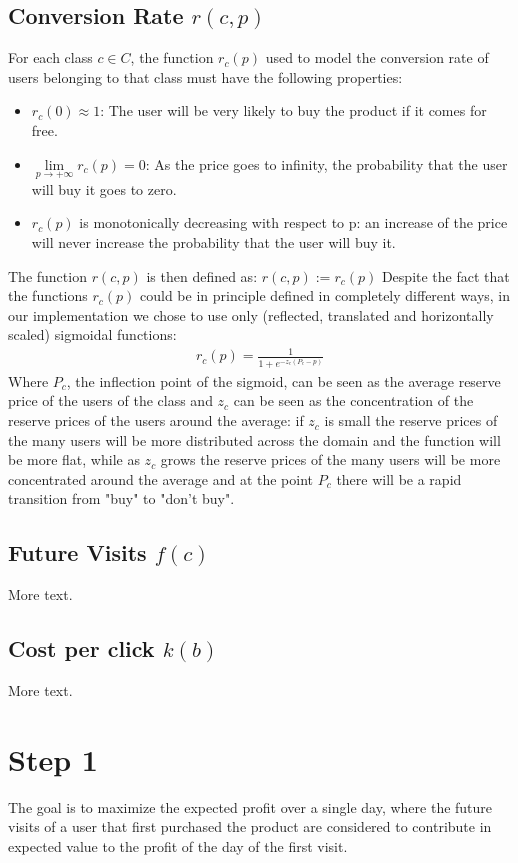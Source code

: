 \documentclass[11pt]{article} %
\begin{document}
\subsection{Conversion Rate $r(c,p)$}
For each class $c \in C$, the function $r_c(p)$ used to model the conversion rate of users belonging to that class must have the following properties:
\begin{itemize}
\item $r_c(0) \approx 1$: The user will be very likely to buy the product if it comes for free.
\item $\lim\limits_{p \to +\infty} r_c(p) = 0$: As the price goes to infinity, the probability that the user will buy it goes to zero.
\item $r_c(p)$ is monotonically decreasing with respect to p: an increase of the price will never increase the probability that the user will buy it.
\end{itemize}
The function $r(c,p)$ is then defined as: $r(c,p) := r_c(p)$
Despite the fact that the functions $r_c(p)$ could be in principle defined in completely different ways, in our implementation we chose to use only (reflected, translated and horizontally scaled) sigmoidal functions:
\begin{align*}
r_c(p) = \frac{1}{1+e^{-z_c(P_c-p)}}
\end{align*}
Where $P_c$, the inflection point of the sigmoid, can be seen as the average reserve price of the users of the class and $z_c$ can be seen as the concentration of the reserve prices of the users around the average: if $z_c$ is small the reserve prices of the many users will be more distributed across the domain and the function will be more flat, while as $z_c$ grows the reserve prices of the many users will be more concentrated around the average and at the point $P_c$ there will be a rapid transition from "buy" to "don't buy".
\subsection{Future Visits $f(c)$}

More text.

\subsection{Cost per click $k(b)$}

More text.

\section{Step 1}
The goal is to maximize the expected profit over a single day, where the future visits of a user that first purchased the product are considered to contribute in expected value to the profit of the day of the first visit.
\end{document}

